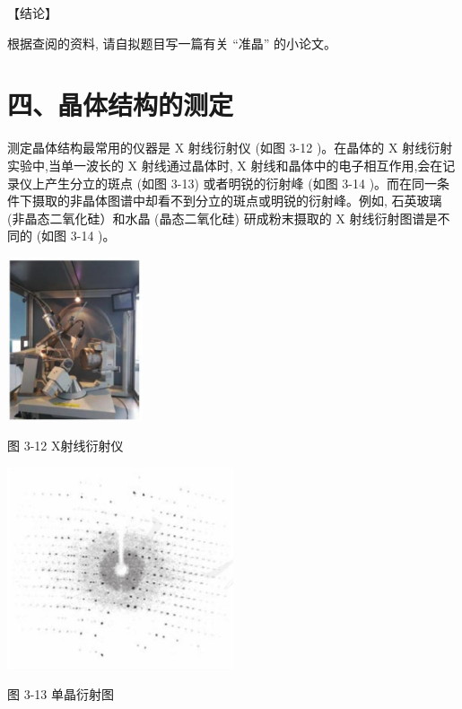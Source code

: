 \documentclass[10pt]{article}
\begin{document}
【结论】

根据查阅的资料, 请自拟题目写一篇有关 “准晶” 的小论文。

\section*{四、晶体结构的测定}

测定晶体结构最常用的仪器是 \(\mathrm{X}\) 射线衍射仪 (如图 3-12 )。在晶体的 \(\mathrm{X}\) 射线衍射实验中,当单一波长的 \(\mathrm{X}\) 射线通过晶体时, \(\mathrm{X}\) 射线和晶体中的电子相互作用,会在记录仪上产生分立的斑点 (如图 3-13) 或者明锐的衍射峰 (如图 3-14 )。而在同一条件下摄取的非晶体图谱中却看不到分立的斑点或明锐的衍射峰。例如, 石英玻璃 (非晶态二氧化硅）和水晶 (晶态二氧化硅) 研成粉末摄取的 \(\mathrm{X}\) 射线衍射图谱是不同的 (如图 3-14 )。

\begin{center}
\includegraphics[max width=0.3\textwidth]{images/0190e026-5a11-7df7-bd27-54d09026ba7a_78_939984.jpg}
\end{center}

图 3-12 X射线衍射仪

\begin{center}
\includegraphics[max width=0.5\textwidth]{images/0190e026-5a11-7df7-bd27-54d09026ba7a_78_486931.jpg}
\end{center}

图 3-13 单晶衍射图
\end{document}

